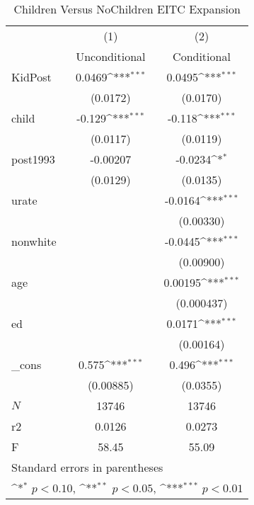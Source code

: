 \documentclass{article}
\begin{document}
\begin{enumerate}
\begin{table}[htbp]\centering
	\def\sym#1{\ifmmode^{#1}\else\(^{#1}\)\fi}
	\caption{Children Versus NoChildren EITC Expansion}
	\begin{tabular}{l*{2}{c}}
		\hline\hline
		&\multicolumn{1}{c}{(1)}&\multicolumn{1}{c}{(2)}\\
		&\multicolumn{1}{c}{Unconditional}&\multicolumn{1}{c}{Conditional}\\
		\hline
		KidPost     &      0.0469\sym{***}&      0.0495\sym{***}\\
		&    (0.0172)         &    (0.0170)         \\
		[1em]
		child       &      -0.129\sym{***}&      -0.118\sym{***}\\
		&    (0.0117)         &    (0.0119)         \\
		[1em]
		post1993    &    -0.00207         &     -0.0234\sym{*}  \\
		&    (0.0129)         &    (0.0135)         \\
		[1em]
		urate       &                     &     -0.0164\sym{***}\\
		&                     &   (0.00330)         \\
		[1em]
		nonwhite    &                     &     -0.0445\sym{***}\\
		&                     &   (0.00900)         \\
		[1em]
		age         &                     &     0.00195\sym{***}\\
		&                     &  (0.000437)         \\
		[1em]
		ed          &                     &      0.0171\sym{***}\\
		&                     &   (0.00164)         \\
		[1em]
		\_cons      &       0.575\sym{***}&       0.496\sym{***}\\
		&   (0.00885)         &    (0.0355)         \\
		\hline
		\(N\)       &       13746         &       13746         \\
		r2          &      0.0126         &      0.0273         \\
		F           &       58.45         &       55.09         \\
		\hline\hline
		\multicolumn{3}{l}{\footnotesize Standard errors in parentheses}\\
		\multicolumn{3}{l}{\footnotesize \sym{*} \(p<0.10\), \sym{**} \(p<0.05\), \sym{***} \(p<0.01\)}\\
	\end{tabular}
\end{table}







\end{enumerate}
\end{document}
